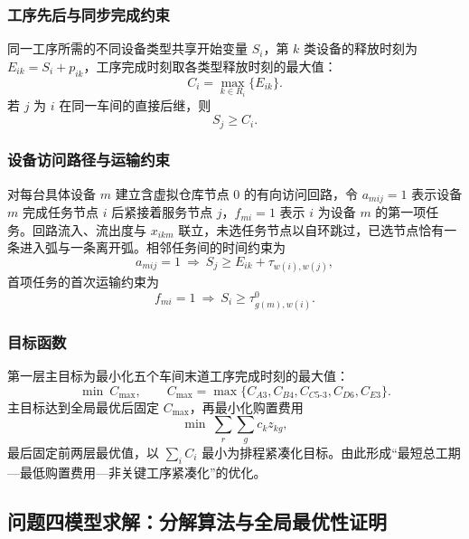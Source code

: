 \documentclass[12pt,a4paper]{article}
\begin{document}
\subsubsection{工序先后与同步完成约束}

同一工序所需的不同设备类型共享开始变量 $S_i$，第 $k$ 类设备的释放时刻为 $E_{ik}=S_i+p_{ik}$，工序完成时刻取各类型释放时刻的最大值：
\begin{equation}
C_i=\max_{k\in R_i}\{E_{ik}\}.
\end{equation}
若 $j$ 为 $i$ 在同一车间的直接后继，则
\begin{equation}
S_j\ge C_i .
\end{equation}

\subsubsection{设备访问路径与运输约束}

对每台具体设备 $m$ 建立含虚拟仓库节点 0 的有向访问回路，令 $a_{mij}=1$ 表示设备 $m$ 完成任务节点 $i$ 后紧接着服务节点 $j$，$f_{mi}=1$ 表示 $i$ 为设备 $m$ 的第一项任务。回路流入、流出度与 $x_{ikm}$ 联立，未选任务节点以自环跳过，已选节点恰有一条进入弧与一条离开弧。相邻任务间的时间约束为
\begin{equation}
a_{mij}=1\ \Rightarrow\ S_j\ge E_{ik}+\tau_{w(i),w(j)},
\end{equation}
首项任务的首次运输约束为
\begin{equation}
f_{mi}=1\ \Rightarrow\ S_i\ge \tau^{0}_{g(m),w(i)} .
\end{equation}

\subsubsection{目标函数}

第一层主目标为最小化五个车间末道工序完成时刻的最大值：
\begin{equation}
\min\ C_{\max},\qquad C_{\max}=\max\{C_{A3},C_{B4},C_{C5\text{-}3},C_{D6},C_{E3}\}.
\end{equation}
主目标达到全局最优后固定 $C_{\max}$，再最小化购置费用
\begin{equation}
\min\ \sum_{r}\sum_{g} c_k z_{kg},
\end{equation}
最后固定前两层最优值，以 $\sum_i C_i$ 最小为排程紧凑化目标。由此形成“最短总工期—最低购置费用—非关键工序紧凑化”的优化。

\subsection{问题四模型求解：分解算法与全局最优性证明}
\end{document}
